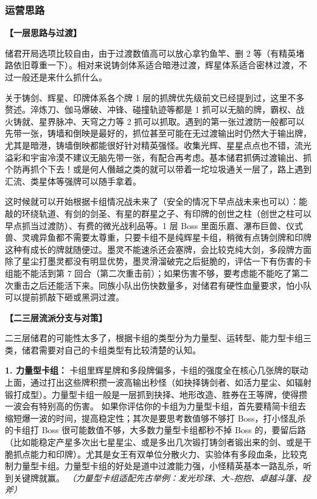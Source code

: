 \documentclass[12pt, a4paper]{article}
\begin{document}
\subsubsection{运营思路}

\textbf{【一层思路与过渡】}

储君开局选项比较自由，由于过渡数值高可以放心拿钓鱼竿、删 2 等（有精英堵路依旧尊重一下）。相对来说铸剑体系适合暗港过渡，辉星体系适合密林过渡，不过一般还是来什么抓什么。

关于铸剑、辉星、印牌体系各个牌 1 层的抓牌优先级前文已经提到过，这里不多赘述。淬炼刀、伽马爆破、冲锋、碰撞轨迹等都是 1 抓可以无脑的牌，霸权、战火铸就、星界脉冲、天穹之力等 2 抓可以抓取。遇到的第一张过渡防一般都可以先带一张，铸墙和倒映是最好的，抓位甚至可能在无过渡输出时仍然大于输出牌，尤其是暗港，铸墙倒映都能很好针对精英强怪。收集光辉、星星点点也不错，流光溢彩和宇宙冷漠不建议无脑先带一张，有配合再考虑。基本储君抓俩过渡输出、抓个防再抓个下去！或是何人僭越之类的就可以带着一坨垃圾通关一层了，路上遇到汇流、类星体等强牌可以随手拿着。

这时候就可以开始根据卡组情况战未来了（安全的情况下早点战未来也可以）：能敲的环绕轨道、有剑的剑圣、有星的群星之子、有印牌的创世之柱（创世之柱可以早点抓当过渡防）、有费的微光战利品等。1 层 Boss 里面乐嘉、瀑布巨兽、仪式兽、灵魂异鱼都不需要太尊重，只要卡组不是纯辉星卡组，稍微有点铸剑牌和印牌这种有成长的牌就随便过。墨灵不能速杀还会塞牌，会比较克纯大剑，多段牌方面除了星尘打墨灵都没有明显优势，墨灵滑溜破完之后挺脆的，评估一下有伤害的卡组能不能活到第 7 回合（第二次重击前）；如果伤害不够，要考虑能不能吃了第二次重击之后还能活下来。同族小队出伤快数量多，对储君有硬性血量要求，怕小队可以提前抓敲下砸或黑洞过渡。

\textbf{【二三层流派分支与对策】}

二三层储君的可能性太多了，根据卡组的类型分为力量型、运转型、能力型卡组三类，储君需要对自己的卡组类型有比较清楚的认知。

\textbf{1. 力量型卡组：}
卡组里辉星牌和多段牌偏多，卡组的强度全在核心几张牌的联动上面，通过打出这些牌积攒一波高输出秒怪（如抉择铸剑者、如活力星尘、如辐射锻打成型）。力量型卡组一般是一层抓到抉择、地形改造、胜券在王等牌，使得攒一波会有特别高的伤害。
如果你评估你的卡组为力量型卡组，首先要精简卡组去缩短爆一波的时间，提高稳定性；其次是要思考数值够不够打 Boss，打小怪乱杀的卡组打 Boss 很可能数值不够，大多数力量型卡组都秒不掉 Boss 的，要留后路（比如能稳定产星多次出七星星尘、或是多出几次锻打铸剑者锻出来的剑、或是干脆抓点能力和印牌）。尤其是女王有双单位分散火力、实验体有多段血条，比较克制力量型卡组。力量型卡组的好处是道中过渡能力强，小怪精英基本一路乱杀，听到关键牌就赢。
\textit{（力量型卡组适配先古举例：发光珍珠、大\textasciitilde 抱抱、卓越斗篷、投斧）}
\end{document}
